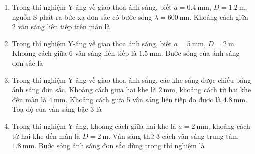 \begin{enumerate}
{	}
	\item
	{
		Trong thí nghiệm Y-âng về giao thoa ánh sáng, biết $a=\SI{0.4}{\milli \meter}$, $D=\SI{1.2}{\meter}$, nguồn S phát ra bức xạ đơn sắc có bước sóng $\lambda = \SI{600}{\nano \meter}$. Khoảng cách giữa 2 vân sáng liên tiếp trên màn là
	}
	\item
	{
		Trong thí nghiệm Y-âng về giao thoa ánh sáng, biết $a=\SI{5}{\milli \meter}$, $D=\SI{2}{\meter}$. Khoảng cách giữa 6 vân sáng liên tiếp là $\SI{1.5}{\milli \meter}$. Bước sóng của ánh sáng đơn sắc là
	}
	\item
	{
		Trong thí nghiệm Y-âng về giao thoa ánh sáng, các khe sáng được chiếu bằng ánh sáng đơn sắc. Khoảng cách giữa hai khe là $\SI{2}{\milli \meter}$, khoảng cách từ hai khe đến màn là $\SI{4}{\milli \meter}$. Khoảng cách giữa 5 vân sáng liên tiếp đo được là $\SI{4.8}{\milli \meter}$. Toạ độ của vân sáng bậc 3 là
	}
	\item
	{
		Trong thí nghiệm Y-âng, khoảng cách giữa hai khe là $a=\SI{2}{\milli \meter}$, khoảng cách từ hai khe đến màn là $D=\SI{2}{\meter}$. Vân sáng thứ 3 cách vân sáng trung tâm $\SI{1.8}{\milli \meter}$. Bước sóng ánh sáng đơn sắc dùng trong thí nghiệm là
		}
\end{enumerate}
